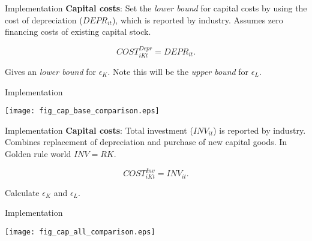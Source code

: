 \documentclass[10pt, xcolor=dvipsnames]{beamer}
\begin{document}
\begin{frame}{Implementation}
\textbf{Capital costs}: Set the \textit{lower bound} for capital costs by using the cost of depreciation ($DEPR_{it}$), which is reported by industry. Assumes zero financing costs of existing capital stock.

\begin{equation}
  COST_{iKt}^{Depr} = DEPR_{it}.
\end{equation}

Gives an \textit{lower bound} for $\epsilon_K$. Note this will be the \textit{upper bound} for $\epsilon_L$.

\end{frame}

\begin{frame}{Implementation}
\begin{center}
\texttt{[image: fig\_cap\_base\_comparison.eps]}
\end{center}
\end{frame}

\begin{frame}{Implementation}
\textbf{Capital costs}: Total investment ($INV_{it}$) is reported by industry. Combines replacement of depreciation and purchase of new capital goods. In Golden rule world $INV = RK$. 

\begin{equation}
  COST_{iKt}^{Inv} = INV_{it}.
\end{equation}

Calculate $\epsilon_K$ and $\epsilon_L$. 

\end{frame}

\begin{frame}{Implementation}
\begin{center}
\texttt{[image: fig\_cap\_all\_comparison.eps]}
\end{center}
\end{frame}
\end{document}
